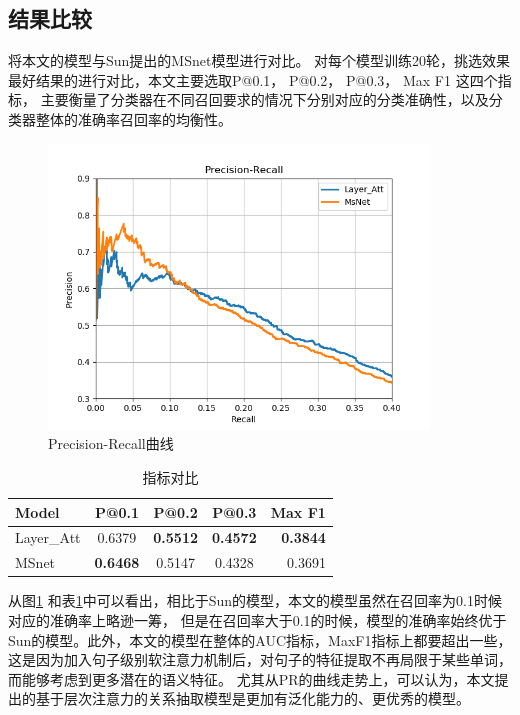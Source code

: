 \documentclass[UTF8]{csoarticle}
\begin{document}
\subsection{结果比较}
将本文的模型与Sun\cite{bib12}提出的MSnet模型进行对比。
对每个模型训练20轮，挑选效果最好结果的进行对比，本文主要选取P@0.1， P@0.2， P@0.3， Max F1 这四个指标，
主要衡量了分类器在不同召回要求的情况下分别对应的分类准确性，以及分类器整体的准确率召回率的均衡性。

\begin{figure}[ht]
\centering
\includegraphics[width=0.9\textwidth]{pr_curve.png} 
\caption{Precision-Recall曲线}
\label{fig1}
\end{figure}


\begin{table}
\begin{center}

\begin{tabular}{l||c|c|c|r|}
Model & P@0.1 & P@0.2 & P@0.3 & Max F1\\
\hline
Layer\_Att& 0.6379          & \textbf{0.5512}& \textbf{0.4572}& \textbf{0.3844} \\
MSnet     & \textbf{0.6468} & 0.5147         & 0.4328          & 0.3691 \\
\end{tabular}
\end{center}

\caption{指标对比}
\label{tab1}
\end{table}


从图\ref {fig1} 和表\ref {tab1}中可以看出，相比于Sun\cite{bib12}的模型，本文的模型虽然在召回率为0.1时候对应的准确率上略逊一筹，
但是在召回率大于0.1的时候，模型的准确率始终优于Sun的模型。此外，本文的模型在整体的AUC指标，MaxF1指标上都要超出一些，
这是因为加入句子级别软注意力机制后，对句子的特征提取不再局限于某些单词，而能够考虑到更多潜在的语义特征。
尤其从PR的曲线走势上，可以认为，本文提出的基于层次注意力的关系抽取模型是更加有泛化能力的、更优秀的模型。
\end{document}
